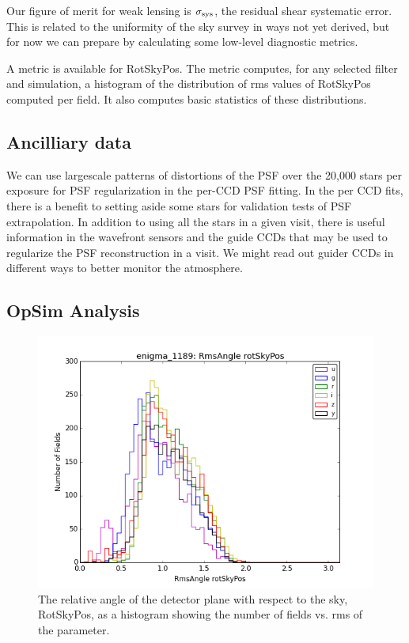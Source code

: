 Our figure of merit for weak lensing is $\sigma_{\rm sys}$, the
residual shear systematic error. This is related to the uniformity of
the sky survey in ways not yet derived, but for now we can prepare by
calculating some low-level diagnostic metrics.

A metric is available for RotSkyPos.  The metric computes, for any
selected filter and simulation, a histogram of the distribution of rms
values of RotSkyPos computed per field. It also computes basic
statistics of these distributions.

\subsection{Ancilliary data}

We can use largescale patterns of distortions of the PSF over the 20,000 stars per exposure for
PSF regularization in the per-CCD PSF fitting. In the per CCD fits, there is a benefit to
setting aside some stars for validation tests of PSF extrapolation.
In addition to using all the stars in a given visit, there is useful information in the
wavefront sensors and the guide CCDs that may be used to regularize the PSF
reconstruction in a visit. We might read out guider CCDs in different ways to better
monitor the atmosphere.

\subsection{OpSim Analysis}

\begin{figure}
\centering\includegraphics[width=\linewidth]{figs/enigma1189RmsAnglerotSkyPosugrizybandallpropsOPSIComboHistogram.png}
\caption{The relative angle of the detector plane with respect to the sky, RotSkyPos, as a histogram showing the number of fields vs. rms of the parameter.}
\label{RotSkyPos}
\end{figure}


